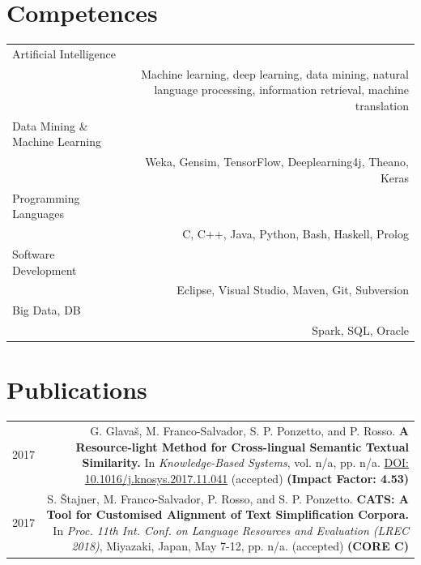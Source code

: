 \documentclass[10pt]{article}
\begin{document}
\section*{Competences}
\begin{tabular}{L!{\VRule}R}
Artificial Intelligence\\&Machine learning, deep learning, data mining, natural language processing, information retrieval, machine translation\\
Data Mining \& Machine Learning\\&Weka, Gensim, TensorFlow, Deeplearning4j, Theano, Keras\\
Programming Languages\\&C, C++, Java, Python, Bash, Haskell, Prolog\\
Software Development\\&Eclipse, Visual Studio, Maven, Git, Subversion\\
Big Data, DB\\& Spark, SQL, Oracle\\
\end{tabular}



\section*{Publications}
\begin{tabular}{L!{\VRule}R}
	2017 & G. Glava{\v s}, M. Franco-Salvador, S. P. Ponzetto, and P. Rosso. \textbf{A Resource-light Method for Cross-lingual Semantic Textual Similarity.}
	In \emph{Knowledge-Based Systems}, vol. n/a, pp. n/a. \href{https://doi.org/10.1016/j.knosys.2017.11.041}{DOI: 10.1016/j.knosys.2017.11.041} (accepted) \textbf{(Impact Factor: 4.53)} \vspace{5pt}\\	
	2017 & S. \v{S}tajner, M. Franco-Salvador, P. Rosso, and S. P. Ponzetto. \textbf{CATS: A Tool for Customised Alignment of Text Simplification Corpora.} In \emph{Proc. 11th Int. Conf. on Language Resources and Evaluation (LREC 2018)}, Miyazaki, Japan, May 7-12, pp. n/a. (accepted) \textbf{(CORE C)} \vspace{5pt}\\	
	\end{tabular}
\end{document}
